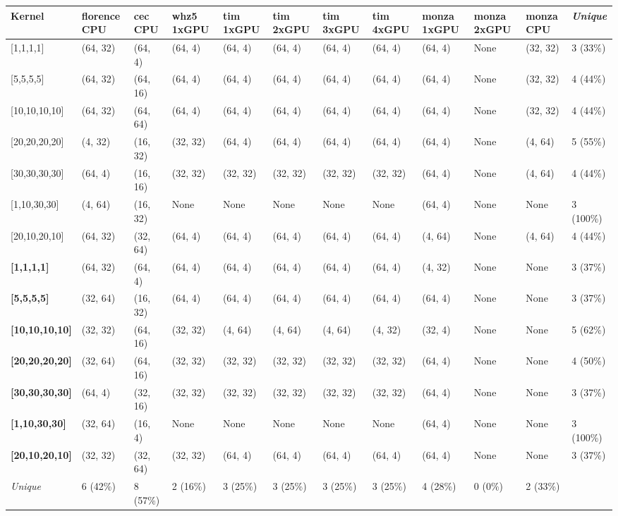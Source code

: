 \begin{tabular}{|p{1.8cm} | p{1cm} | p{1cm} | p{1cm} | p{1cm} | p{1cm} | p{1cm} | p{1cm} | p{1cm} | p{1cm} | p{1cm} | p{1.1cm}|}
\hline
\textbf{Kernel} & \textbf{florence CPU} & \textbf{cec CPU} & \textbf{whz5 1xGPU} & \textbf{tim 1xGPU} & \textbf{tim 2xGPU} & \textbf{tim 3xGPU} & \textbf{tim 4xGPU} & \textbf{monza 1xGPU} & \textbf{monza 2xGPU} & \textbf{monza CPU} & \textit{Unique}\\
\hline
{[}1,1,1,1{]} & (64, 32) & (64, 4) & (64, 4) & (64, 4) & (64, 4) & (64, 4) & (64, 4) & (64, 4) & None & (32, 32) & 3 (33\%)\\
{[}5,5,5,5{]} & (64, 32) & (64, 16) & (64, 4) & (64, 4) & (64, 4) & (64, 4) & (64, 4) & (64, 4) & None & (32, 32) & 4 (44\%)\\
{[}10,10,10,10{]} & (64, 32) & (64, 64) & (64, 4) & (64, 4) & (64, 4) & (64, 4) & (64, 4) & (64, 4) & None & (32, 32) & 4 (44\%)\\
{[}20,20,20,20{]} & (4, 32) & (16, 32) & (32, 32) & (64, 4) & (64, 4) & (64, 4) & (64, 4) & (64, 4) & None & (4, 64) & 5 (55\%)\\
{[}30,30,30,30{]} & (64, 4) & (16, 16) & (32, 32) & (32, 32) & (32, 32) & (32, 32) & (32, 32) & (64, 4) & None & (4, 64) & 4 (44\%)\\
{[}1,10,30,30{]} & (4, 64) & (16, 32) & None & None & None & None & None & (64, 4) & None & None & 3 (100\%)\\
{[}20,10,20,10{]} & (64, 32) & (32, 64) & (64, 4) & (64, 4) & (64, 4) & (64, 4) & (64, 4) & (4, 64) & None & (4, 64) & 4 (44\%)\\
\textbf{{[}1,1,1,1{]}} & (64, 32) & (64, 4) & (64, 4) & (64, 4) & (64, 4) & (64, 4) & (64, 4) & (4, 32) & None & None & 3 (37\%)\\
\textbf{{[}5,5,5,5{]}} & (32, 64) & (16, 32) & (64, 4) & (64, 4) & (64, 4) & (64, 4) & (64, 4) & (64, 4) & None & None & 3 (37\%)\\
\textbf{{[}10,10,10,10{]}} & (32, 32) & (64, 16) & (32, 32) & (4, 64) & (4, 64) & (4, 64) & (4, 32) & (32, 4) & None & None & 5 (62\%)\\
\textbf{{[}20,20,20,20{]}} & (32, 64) & (64, 16) & (32, 32) & (32, 32) & (32, 32) & (32, 32) & (32, 32) & (64, 4) & None & None & 4 (50\%)\\
\textbf{{[}30,30,30,30{]}} & (64, 4) & (32, 16) & (32, 32) & (32, 32) & (32, 32) & (32, 32) & (32, 32) & (64, 4) & None & None & 3 (37\%)\\
\textbf{{[}1,10,30,30{]}} & (32, 64) & (16, 4) & None & None & None & None & None & (64, 4) & None & None & 3 (100\%)\\
\textbf{{[}20,10,20,10{]}} & (32, 32) & (32, 64) & (32, 32) & (64, 4) & (64, 4) & (64, 4) & (64, 4) & (64, 4) & None & None & 3 (37\%)\\
\hline
\textit{Unique} & 6 (42\%) & 8 (57\%) & 2 (16\%) & 3 (25\%) & 3 (25\%) & 3 (25\%) & 3 (25\%) & 4 (28\%) & 0 (0\%) & 2 (33\%) & \\
\hline
\end{tabular}
